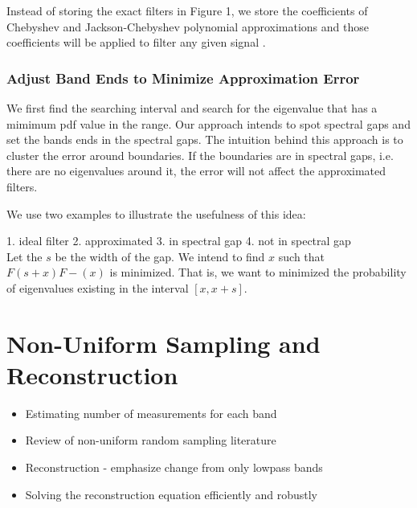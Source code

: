 \documentclass[a4paper]{article}
\theoremstyle{definition}
\begin{document}
Instead of storing the exact filters in Figure 1, we store the coefficients of Chebyshev and Jackson-Chebyshev polynomial approximations\cite{ShumanSIPN2018} and those coefficients will be applied to filter any given signal  \cite{shuman2013spectrum}.


\subsubsection{Adjust Band Ends to Minimize Approximation Error}

We first find the searching interval and search for the eigenvalue that has a mimimum pdf value in the range.
Our approach intends to spot spectral gaps and set the bands ends in the spectral gaps. The intuition behind this approach is to cluster the error around boundaries. If the boundaries are in spectral gaps, i.e. there are no eigenvalues around it, the error will not affect the approximated filters.


We use two examples to illustrate the usefulness of this idea:

1. ideal filter
2. approximated
3. in spectral gap
4. not in spectral gap\\


Let the $s$ be the width of the gap. We intend to find $x$ such that $F(s+x)F-(x)$ is minimized. That is, we want to minimized the probability of eigenvalues existing in the interval $[x, x+s]$.



{\color{blue}
\section{Non-Uniform Sampling and Reconstruction}
\begin{itemize}
\item Estimating number of measurements for each band
\item Review of non-uniform random sampling literature
\item Reconstruction - emphasize change from only lowpass bands
\item {\color{red} Solving the reconstruction equation efficiently and robustly}
\end{itemize}
}
\end{document}
